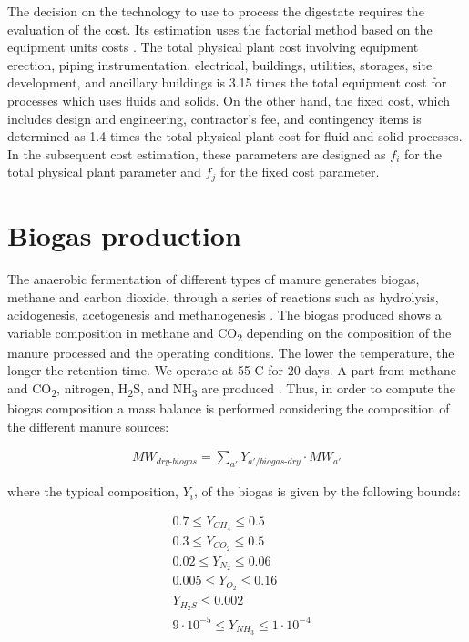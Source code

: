 \begin{refsection}[referencesCh2]
The decision on the technology to use to process the digestate requires the evaluation of the cost. Its estimation uses the factorial method based on the equipment units costs \citet{rk1999coulson}. The total physical plant cost involving equipment erection, piping instrumentation, electrical, buildings, utilities, storages, site development, and ancillary buildings is 3.15 times the total equipment cost for processes which uses fluids and solids. On the other hand, the fixed cost, which includes design and engineering, contractor’s fee, and contingency items is determined as 1.4 times the total physical plant cost for fluid and solid processes. In the subsequent cost estimation, these parameters are designed as $f_i$ for the total physical plant parameter and $f_j$ for the fixed cost parameter.

\section{Biogas production}
The anaerobic fermentation of different types of manure generates biogas, methane and carbon dioxide, through a series of reactions such as hydrolysis, acidogenesis, acetogenesis and methanogenesis \citep{AlSeadi2008}. The biogas produced shows a variable composition in methane and CO\textsubscript{2} depending on the composition of the manure processed and the operating conditions. The lower the temperature, the longer the retention time. We operate at 55 \textdegree C for 20 days. A part from methane and CO\textsubscript{2}, nitrogen, H\textsubscript{2}S, and NH\textsubscript{3} are produced \citep{kaparaju2013generation}. Thus, in order to compute the biogas composition a mass balance is performed considering the composition of the different manure sources:

\begin{align}
	MW_{dry \text{-} biogas} = \sum\limits_{a'} {Y_{a'/biogas \text{-} dry} \cdot MW_{a'}} \label{eq:AnexAEq1}
\end{align}

where the typical composition, $Y_i$,  of the biogas is given by the following bounds:

\begin{align}
	& 0.7 \le Y_{CH_{4}} \le 0.5 \nonumber \\
	& 0.3 \le Y_{CO_{2}} \le 0.5 \nonumber \\
	& 0.02 \le Y_{N_{2}} \le 0.06 \label{eq:AnexAEq2} \\
	& 0.005 \le Y_{O_{2}} \le 0.16 \nonumber \\
	& Y_{H_{2}S} \le 0.002 \nonumber \\
	& 9 \cdot 10^{-5} \le Y_{NH_{3}} \le 1 \cdot 10^{-4}	 \nonumber
\end{align}


\end{refsection}
